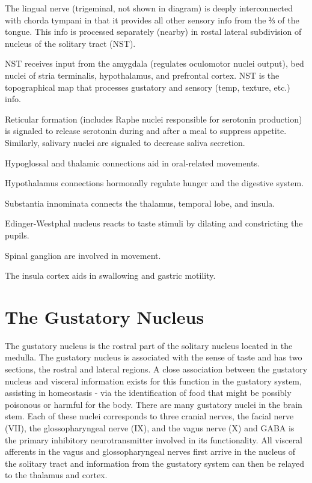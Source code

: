 The lingual nerve (trigeminal, not shown in diagram) is deeply interconnected with chorda tympani in that it provides all other sensory info from the ⅔ of the tongue. This info is processed separately (nearby) in rostal lateral subdivision of nucleus of the solitary tract (NST).

NST receives input from the amygdala (regulates oculomotor nuclei output), bed nuclei of stria terminalis, hypothalamus, and prefrontal cortex. NST is the topographical map that processes gustatory and sensory (temp, texture, etc.) info.

Reticular formation (includes Raphe nuclei responsible for serotonin production) is signaled to release serotonin during and after a meal to suppress appetite. Similarly, salivary nuclei are signaled to decrease saliva secretion.

Hypoglossal and thalamic connections aid in oral-related movements.

Hypothalamus connections hormonally regulate hunger and the digestive system.

Substantia innominata connects the thalamus, temporal lobe, and insula.

Edinger-Westphal nucleus reacts to taste stimuli by dilating and constricting the pupils.

Spinal ganglion are involved in movement.

The insula cortex aids in swallowing and gastric motility.

\hypertarget{the-gustatory-nucleus}{%
\section{The Gustatory Nucleus}\label{the-gustatory-nucleus}}

The gustatory nucleus is the rostral part of the solitary nucleus located in the medulla. The gustatory nucleus is associated with the sense of taste and has two sections, the rostral and lateral regions. A close association between the gustatory nucleus and visceral information exists for this function in the gustatory system, assisting in homeostasis - via the identification of food that might be possibly poisonous or harmful for the body. There are many gustatory nuclei in the brain stem. Each of these nuclei corresponds to three cranial nerves, the facial nerve (VII), the glossopharyngeal nerve (IX), and the vagus nerve (X) and GABA is the primary inhibitory neurotransmitter involved in its functionality. All visceral afferents in the vagus and glossopharyngeal nerves first arrive in the nucleus of the solitary tract and information from the gustatory system can then be relayed to the thalamus and cortex.


